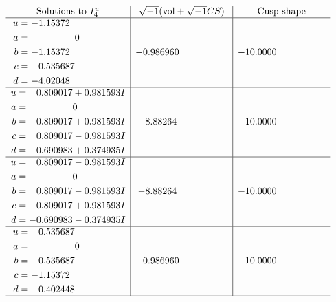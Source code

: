 \documentclass[1p]{elsarticle_modified}
\theoremstyle{definition}
\newcommand{\I}{\sqrt{-1}}
\begin{document}
$$\begin{array}{c|c|c}  
\text{Solutions to }I^u_{4}& \I (\text{vol} + \sqrt{-1}CS) & \text{Cusp shape}\\
 \hline 
\begin{aligned}
u &= -1.15372\phantom{ +0.000000I} \\
a &= \phantom{-0.000000 } 0 \\
b &= -1.15372\phantom{ +0.000000I} \\
c &= \phantom{-}0.535687\phantom{ +0.000000I} \\
d &= -4.02048\phantom{ +0.000000I}\end{aligned}
 & -0.986960\phantom{ +0.000000I} & -10.0000\phantom{ +0.000000I} \\ \hline\begin{aligned}
u &= \phantom{-}0.809017 + 0.981593 I \\
a &= \phantom{-0.000000 } 0 \\
b &= \phantom{-}0.809017 + 0.981593 I \\
c &= \phantom{-}0.809017 - 0.981593 I \\
d &= -0.690983 + 0.374935 I\end{aligned}
 & -8.88264\phantom{ +0.000000I} & -10.0000\phantom{ +0.000000I} \\ \hline\begin{aligned}
u &= \phantom{-}0.809017 - 0.981593 I \\
a &= \phantom{-0.000000 } 0 \\
b &= \phantom{-}0.809017 - 0.981593 I \\
c &= \phantom{-}0.809017 + 0.981593 I \\
d &= -0.690983 - 0.374935 I\end{aligned}
 & -8.88264\phantom{ +0.000000I} & -10.0000\phantom{ +0.000000I} \\ \hline\begin{aligned}
u &= \phantom{-}0.535687\phantom{ +0.000000I} \\
a &= \phantom{-0.000000 } 0 \\
b &= \phantom{-}0.535687\phantom{ +0.000000I} \\
c &= -1.15372\phantom{ +0.000000I} \\
d &= \phantom{-}0.402448\phantom{ +0.000000I}\end{aligned}
 & -0.986960\phantom{ +0.000000I} & -10.0000\phantom{ +0.000000I}\\
 \hline 
 \end{array}$$\newpage\newpage\renewcommand{\arraystretch}{1}
\end{document}
